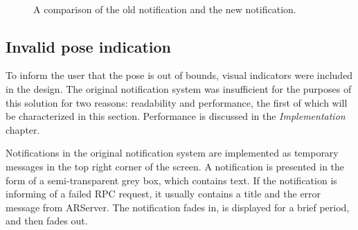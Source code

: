 \begin{figure}
    \centering
    \\
    
    \caption{A comparison of the old notification and the new notification.}
    \label{fig:layout}
\end{figure}

\subsection{Invalid pose indication} 

To inform the user that the pose is out of bounds, visual indicators were included in the design. The original notification system was insufficient for the purposes of this solution for two reasons: readability and performance, the first of which will be characterized in this section. Performance is discussed in the \textit{Implementation} chapter.

Notifications in the original notification system are implemented as temporary messages in the top right corner of the screen. A notification is presented in the form of a semi-transparent grey box, which contains text. If the notification is informing of a failed RPC request, it usually contains a title and the error message from ARServer. The notification fades in, is displayed for a brief period, and then fades out. 

